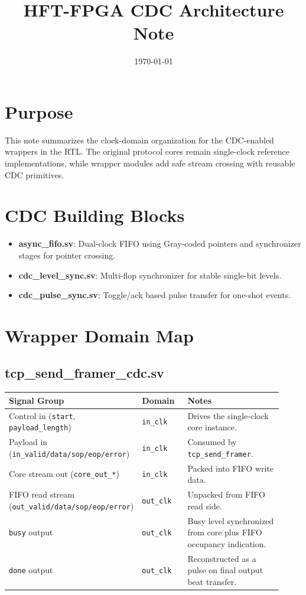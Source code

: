 \documentclass[10pt]{article}
\title{HFT-FPGA CDC Architecture Note}
\author{}
\date{\today}
\begin{document}
\maketitle

\section*{Purpose}
This note summarizes the clock-domain organization for the CDC-enabled wrappers in the RTL. The original protocol cores remain single-clock reference implementations, while wrapper modules add safe stream crossing with reusable CDC primitives.

\section*{CDC Building Blocks}
\begin{itemize}
    \item \textbf{async\_fifo.sv}: Dual-clock FIFO using Gray-coded pointers and synchronizer stages for pointer crossing.
    \item \textbf{cdc\_level\_sync.sv}: Multi-flop synchronizer for stable single-bit levels.
    \item \textbf{cdc\_pulse\_sync.sv}: Toggle/ack based pulse transfer for one-shot events.
\end{itemize}

\section*{Wrapper Domain Map}
\subsection*{tcp\_send\_framer\_cdc.sv}
\begin{longtable}{>{\raggedright\arraybackslash}p{0.22\linewidth} >{\raggedright\arraybackslash}p{0.20\linewidth} >{\raggedright\arraybackslash}p{0.50\linewidth}}
\toprule
\textbf{Signal Group} & \textbf{Domain} & \textbf{Notes} \\
\midrule
\endhead
Control in (\texttt{start}, \texttt{payload\_length}) & \texttt{in\_clk} & Drives the single-clock core instance. \\
Payload in (\texttt{in\_valid/data/sop/eop/error}) & \texttt{in\_clk} & Consumed by \texttt{tcp\_send\_framer}. \\
Core stream out (\texttt{core\_out\_*}) & \texttt{in\_clk} & Packed into FIFO write data. \\
FIFO read stream (\texttt{out\_valid/data/sop/eop/error}) & \texttt{out\_clk} & Unpacked from FIFO read side. \\
\texttt{busy} output & \texttt{out\_clk} & Busy level synchronized from core plus FIFO occupancy indication. \\
\texttt{done} output & \texttt{out\_clk} & Reconstructed as a pulse on final output beat transfer. \\
\bottomrule
\end{longtable}
\end{document}
